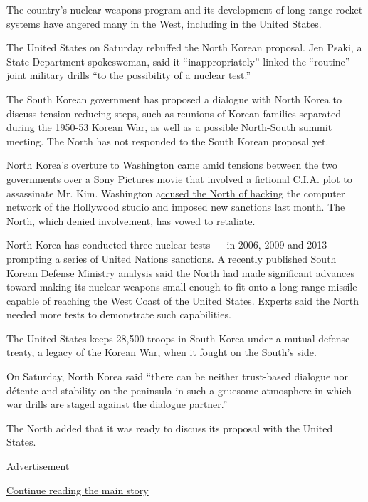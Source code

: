 The country's nuclear weapons program and its development of long-range
rocket systems have angered many in the West, including in the United
States.

The United States on Saturday rebuffed the North Korean proposal. Jen
Psaki, a State Department spokeswoman, said it ``inappropriately''
linked the ``routine'' joint military drills ``to the possibility of a
nuclear test.''

The South Korean government has proposed a dialogue with North Korea to
discuss tension-reducing steps, such as reunions of Korean families
separated during the 1950-53 Korean War, as well as a possible
North-South summit meeting. The North has not responded to the South
Korean proposal yet.

North Korea's overture to Washington came amid tensions between the two
governments over a Sony Pictures movie that involved a fictional C.I.A.
plot to assassinate Mr. Kim. Washington
a\href{http://www.nytimes3xbfgragh.onion/2014/12/18/world/asia/us-links-north-korea-to-sony-hacking.html}{ccused
the North of hacking} the computer network of the Hollywood studio and
imposed new sanctions last month. The North, which
\href{http://www.nytimes3xbfgragh.onion/2014/12/08/business/north-korea-denies-hacking-sony-but-calls-attack-a-righteous-deed.html}{denied
involvement}, has vowed to retaliate.

North Korea has conducted three nuclear tests --- in 2006, 2009 and 2013
--- prompting a series of United Nations sanctions. A recently published
South Korean Defense Ministry analysis said the North had made
significant advances toward making its nuclear weapons small enough to
fit onto a long-range missile capable of reaching the West Coast of the
United States. Experts said the North needed more tests to demonstrate
such capabilities.

The United States keeps 28,500 troops in South Korea under a mutual
defense treaty, a legacy of the Korean War, when it fought on the
South's side.

On Saturday, North Korea said ``there can be neither trust-based
dialogue nor détente and stability on the peninsula in such a gruesome
atmosphere in which war drills are staged against the dialogue
partner.''

The North added that it was ready to discuss its proposal with the
United States.

Advertisement

\protect\hyperlink{after-bottom}{Continue reading the main story}

